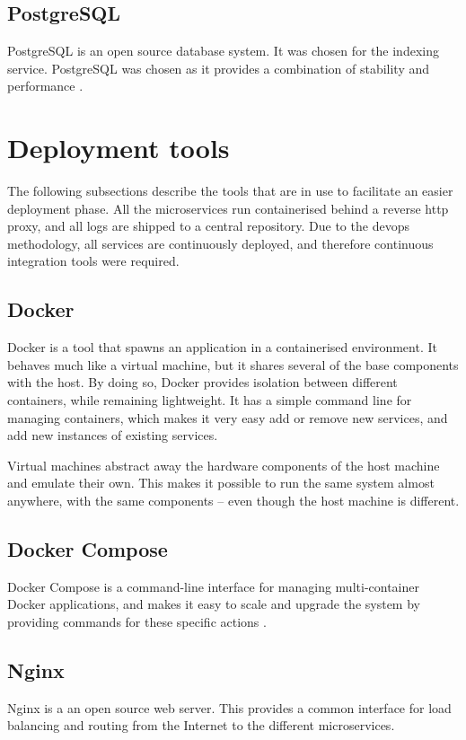 \subsection{PostgreSQL}
PostgreSQL is an open source database system. It was chosen for the indexing service. PostgreSQL was chosen as it provides a combination of stability and performance \citep{whyPostgres}. 

\section{Deployment tools}
The following subsections describe the tools that are in use to facilitate an easier deployment phase. All the microservices run containerised behind a reverse \acrshort{http} proxy, and all logs are shipped to a central repository. Due to the \acrshort{devops} methodology, all services are continuously deployed, and therefore continuous integration tools were required.

\subsection{Docker} \label{subsec:docker}
Docker is a tool that spawns an application in a containerised environment. It behaves much like a virtual machine, but it shares several of the base components with the host.  By doing so, Docker provides isolation between different containers, while remaining lightweight. It has a simple command line for managing containers, which makes it very easy add or remove new services, and add new instances of existing services.

Virtual machines abstract away the hardware components of the host machine and emulate their own. This makes it possible to run the same system almost anywhere, with the same components -- even though the host machine is different.

\subsection{Docker Compose}
Docker Compose is a command-line interface for managing multi-container Docker applications, and makes it easy to scale and upgrade the system by providing commands for these specific actions \citep{dockerCompose}.

\subsection{Nginx}
Nginx is a an open source web server. This provides a common interface for load balancing and routing from the Internet to the different microservices.


